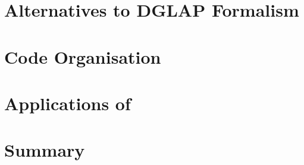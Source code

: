\section{Alternatives to DGLAP Formalism}
\label{sec:alternative}


\section{\fitter Code Organisation}
\label{sec:organisation}


\section{Applications of \fitter}
\label{sec:examples}



\section{Summary}
\label{sec:outlook}





